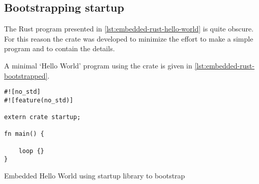 \subsection{Bootstrapping startup}
\label{sec:startup}

The Rust program presented in \autoref{lst:embedded-rust-hello-world} is quite obscure.
For this reason the  crate was developed to minimize the effort to make a simple program and to contain the details.

A minimal `Hello World' program using the  crate is given in \autoref{lst:embedded-rust-bootstrapped}.

\begin{listing}[H]
  \begin{verbatim}
#![no_std]
#![feature(no_std)]

extern crate startup;

fn main() {

    loop {}
}
  \end{verbatim}
  \caption{Embedded Hello World using startup library to bootstrap}
  \label{lst:embedded-rust-bootstrapped}
\end{listing}
